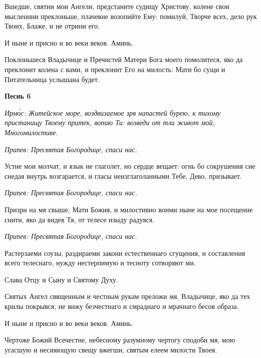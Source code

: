    Вшедше, святии мои Ангели, предстаните судищу Христову, колене свои
мысленнии преклоньше, плачевне возопийте Ему: помилуй, Творче всех, дело
рук Твоих, Блаже, и не отрини его.



   И ныне и присно и во веки веков. Аминь.



   Поклоньшеся Владычице и Пречистей Матери Бога моего помолитеся,
яко да преклонит колена с вами, и преклонит Его на милость: Мати бо сущи
и Питательница услышана будет.



 

\bfseries Песнь 6\normalfont{}


 \itshape Ирмо́с:\normalfont{} Житейское море, воздвизаемое зря напастей бурею, к тихому пристанищу
Твоему притек, вопию Ти: возведи от тли живот мой, Многомилостиве.



 \itshape Припев:\normalfont{} Пресвятая Богородице, спаси нас.



   Устне мои молчат, и язык не глаголет, но сердце вещает: огнь бо
сокрушения сие снедая внутрь возгарается, и гласы неизглаголанными Тебе,
Дево, призывает.



 \itshape Припев:\normalfont{} Пресвятая Богородице, спаси нас.




   Призри на мя свыше, Мати Божия, и милостивно вонми ныне на мое
посещение снити, яко да видев Тя, от телесе изыду радуяся.



 \itshape Припев:\normalfont{} Пресвятая Богородице, спаси нас.



   Растерзаеми соузы, раздираеми закони естественнаго сгущения, и
составления всего телеснаго, нужду нестерпимую и тесноту сотворяют
ми.



   Слава Отцу и Сыну и Святому Духу.



   Святых Ангел священным и честным рукам преложи мя, Владычице, яко
да тех крилы покрывся, не вижу безчестнаго и смраднаго и мрачнаго бесов
образа.



   И ныне и присно и во веки веков. Аминь.



   Чертоже Божий Всечестне, небесному разумному чертогу сподоби мя,
мою угасшую и несияющую свещу вжегши, святым елеем милости
Твоея.




